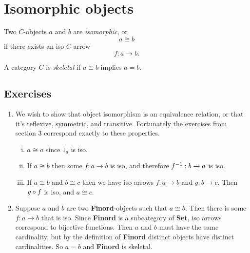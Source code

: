 \documentclass[12pt]{article}
\begin{document}
\section{Isomorphic objects}

    \begin{definition}
        Two $C$-objects $a$ and $b$ are \emph{isomorphic}, or 
        $$a \cong b$$ 
        if there exists an iso $C$-arrow
        $$f: a \to b.$$
    \end{definition}

    \begin{definition}
        A category $C$ is \emph{skeletal} if $a \cong b$ implies $a = b$.
    \end{definition}

    \subsection{Exercises}
        \begin{enumerate}
            \item We wish to show that object isomorphism is an equivalence relation, or that it's reflexive, symmetric, and transitive. Fortunately the exercises from section 3 correspond exactly to these properties.
            \begin{enumerate}[(i)]
                \item $a \cong a$ since $1_a$ is iso.
                \item If $a \cong b$ then some $f : a \to b$ is iso, and therefore $f^{-1} : b \to a$ is iso.
                \item If $a \cong b$ and $b \cong c$ then we have iso arrows $f : a \to b$ and $g : b \to c$. Then $g \circ f$ is iso, and $a \cong c$.
            \end{enumerate}

            \item Suppose $a$ and $b$ are two \textbf{Finord}-objects such that $a \cong b$. Then there is some $f : a \to b$ that is iso.
            Since \textbf{Finord} is a subcategory of \textbf{Set}, iso arrows correspond to bijective functions.
            Then $a$ and $b$ must have the same cardinality, but by the definition of \textbf{Finord} distinct objects have distinct cardinalities. So $a = b$ and \textbf{Finord} is skeletal.
            
        \end{enumerate}
\end{document}
